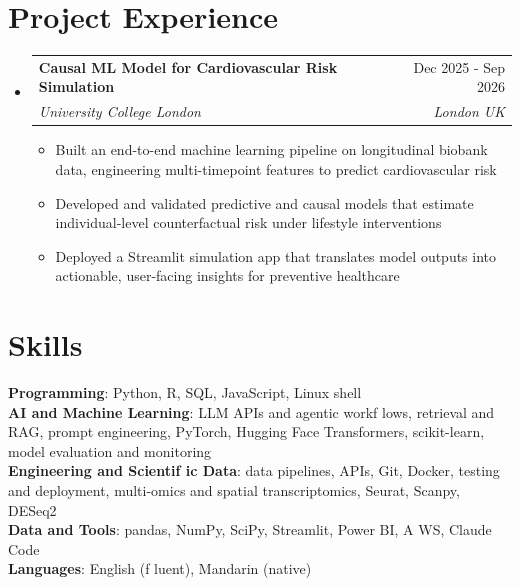 \documentclass[letterpaper,11pt]{article}
\makeatletter
\newcommand{\resumeItem}[1]{
  \item\small{
    {#1 \vspace{-2pt}}
  }
}
\newcommand{\resumeSubheading}[4]{
  \vspace{-2pt}\item
    \begin{tabular*}{0.97\textwidth}[t]{l@{\extracolsep{\fill}}r}
      \textbf{#1} & #2 \\
      \textit{\small#3} & \textit{\small #4} \\
    \end{tabular*}\vspace{-7pt}
}
\newcommand{\resumeSubHeadingListStart}{\begin{itemize}[leftmargin=0.15in, label={}]}
\newcommand{\resumeSubHeadingListEnd}{\end{itemize}}
\newcommand{\resumeItemListStart}{\begin{itemize}}
\newcommand{\resumeItemListEnd}{\end{itemize}\vspace{-5pt}}
\makeatother
\begin{document}
\section{\textbf{Project Experience}}
  \resumeSubHeadingListStart

    \resumeSubheading
      {Causal ML Model for Cardiovascular Risk Simulation}{Dec 2025 - Sep 2026}
      {University College London}{London \textbf{\textbar{}} UK}
      \resumeItemListStart
        \resumeItem{Built an end-to-end machine learning pipeline on longitudinal biobank data, engineering multi-timepoint features to predict cardiovascular risk}
        \resumeItem{Developed and validated predictive and causal models that estimate individual-level counterfactual risk under lifestyle interventions}
        \resumeItem{Deployed a Streamlit simulation app that translates model outputs into actionable, user-facing insights for preventive healthcare}
      \resumeItemListEnd

    \resumeSubHeadingListEnd

\enlargethispage{2\baselineskip}
\section{\textbf{Skills}}
 \begin{itemize}[leftmargin=0.15in, label={}]
    \small{\item{
     \textbf{Programming}{: Python, R, SQL, JavaScript, Linux shell} \\
     \textbf{AI and Machine Learning}{: LLM APIs and agentic workf\kern0pt lows, retrieval and RAG, prompt engineering, PyTorch, Hugging Face Transformers, scikit-learn, model evaluation and monitoring} \\
     \textbf{Engineering and Scientif\kern0pt ic Data}{: data pipelines, APIs, Git, Docker, testing and deployment, multi-omics and spatial transcriptomics, Seurat, Scanpy, DESeq2} \\
     \textbf{Data and Tools}{: pandas, NumPy, SciPy, Streamlit, Power BI, A\kern0pt WS, Claude Code} \\
     \textbf{Languages}{: English (f\kern0pt luent), Mandarin (native)}}}

 \end{itemize}
\end{document}
